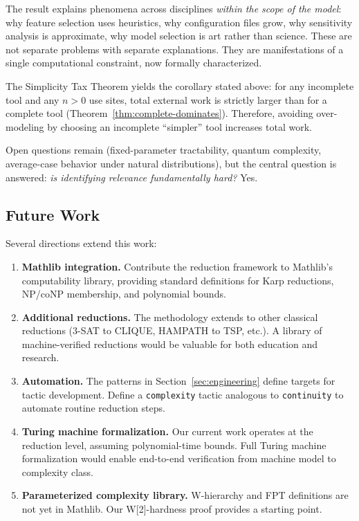 The result explains phenomena across disciplines \emph{within the scope of the model}: why feature selection uses heuristics, why configuration files grow, why sensitivity analysis is approximate, why model selection is art rather than science. These are not separate problems with separate explanations. They are manifestations of a single computational constraint, now formally characterized.

The Simplicity Tax Theorem yields the corollary stated above: for any incomplete tool and any $n>0$ use sites, total external work is strictly larger than for a complete tool (Theorem~\ref{thm:complete-dominates}). Therefore, avoiding over-modeling by choosing an incomplete ``simpler'' tool increases total work.

Open questions remain (fixed-parameter tractability, quantum complexity, average-case behavior under natural distributions), but the central question is answered: \emph{is identifying relevance fundamentally hard?} Yes.

\subsection*{Future Work}

Several directions extend this work:

\begin{enumerate}
\item \textbf{Mathlib integration.} Contribute the reduction framework to Mathlib's computability library, providing standard definitions for Karp reductions, NP/coNP membership, and polynomial bounds.

\item \textbf{Additional reductions.} The methodology extends to other classical reductions (3-SAT to CLIQUE, HAMPATH to TSP, etc.). A library of machine-verified reductions would be valuable for both education and research.

\item \textbf{Automation.} The patterns in Section~\ref{sec:engineering} define targets for tactic development. Define a \texttt{complexity} tactic analogous to \texttt{continuity} to automate routine reduction steps.

\item \textbf{Turing machine formalization.} Our current work operates at the reduction level, assuming polynomial-time bounds. Full Turing machine formalization would enable end-to-end verification from machine model to complexity class.

\item \textbf{Parameterized complexity library.} W-hierarchy and FPT definitions are not yet in Mathlib. Our W[2]-hardness proof provides a starting point.
\end{enumerate}

